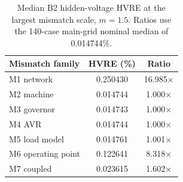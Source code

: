 \begin{table}[t]
\caption{Median B2 hidden-voltage HVRE at the largest mismatch scale, $m=1.5$. Ratios use the 140-case main-grid nominal median of 0.014744\%.}
\label{tab:mismatch-results}
\centering
\footnotesize
\begin{tabular}{lcc}
\toprule
Mismatch family & HVRE (\%) & Ratio \\
\midrule
M1 network & 0.250430 & 16.985$\times$ \\
M2 machine & 0.014744 & 1.000$\times$ \\
M3 governor & 0.014743 & 1.000$\times$ \\
M4 AVR & 0.014744 & 1.000$\times$ \\
M5 load model & 0.014761 & 1.001$\times$ \\
M6 operating point & 0.122641 & 8.318$\times$ \\
M7 coupled & 0.023615 & 1.602$\times$ \\
\bottomrule
\end{tabular}
\end{table}
